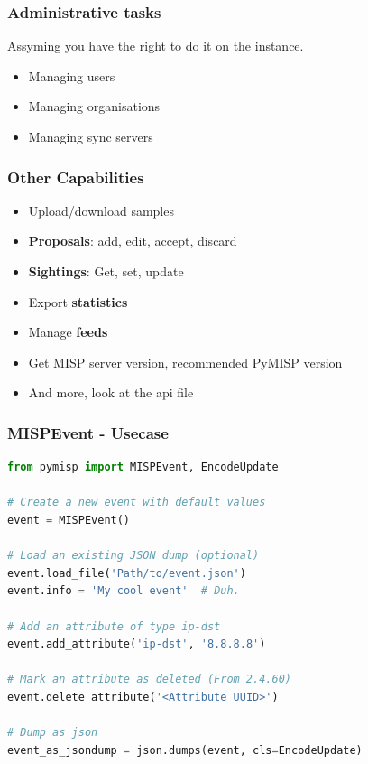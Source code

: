 \begin{frame}
	\frametitle{Administrative tasks}
	Assyming you have the right to do it on the instance.
	\begin{itemize}
		\item Managing users
		\item Managing organisations
		\item Managing sync servers
	\end{itemize}
\end{frame}

\begin{frame}[fragile]
    \frametitle{Other Capabilities}
    \begin{itemize}
        \item Upload/download samples
        \item {\bf Proposals}: add, edit, accept, discard
        \item {\bf Sightings}: Get, set, update
		\item Export {\bf statistics}
        \item Manage {\bf feeds}
        \item Get MISP server version, recommended PyMISP version
        \item And more, look at the api file
    \end{itemize}
\end{frame}

\begin{frame}[fragile]
	\frametitle{MISPEvent - Usecase}
	\begin{adjustbox}{width=\textwidth,height=3cm,keepaspectratio}
		\begin{lstlisting}[language=Python,firstnumber=1]
from pymisp import MISPEvent, EncodeUpdate

# Create a new event with default values
event = MISPEvent()

# Load an existing JSON dump (optional)
event.load_file('Path/to/event.json')
event.info = 'My cool event'  # Duh.

# Add an attribute of type ip-dst
event.add_attribute('ip-dst', '8.8.8.8')

# Mark an attribute as deleted (From 2.4.60)
event.delete_attribute('<Attribute UUID>')

# Dump as json
event_as_jsondump = json.dumps(event, cls=EncodeUpdate)
		\end{lstlisting}
	\end{adjustbox}
\end{frame}

